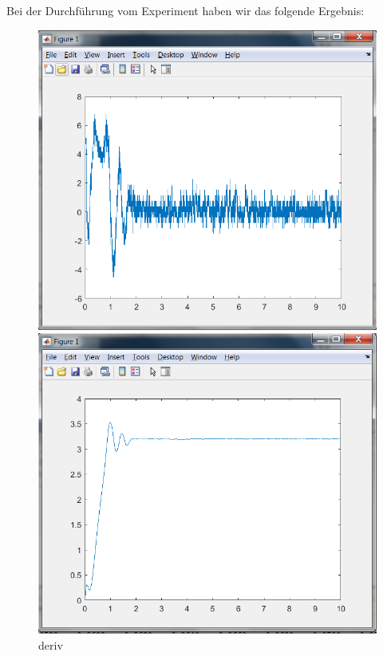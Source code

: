 \documentclass{article}
\newcommand{\geru}{\"{u}}
\begin{document}
Bei der Durchf\geru hrung vom Experiment haben wir das folgende Ergebnis:
\begin{figure}[h]
  \centering
  \begin{minipage}[b]{0.4\textwidth}
    \includegraphics[width=\textwidth]{radianSpeed.PNG}
    \caption{deriv}
  \end{minipage}
  \hfill
  \begin{minipage}[b]{0.4\textwidth}
    \includegraphics[width=\textwidth]{Angle1.PNG}

\end{minipage}
\end{figure}
\end{document}
